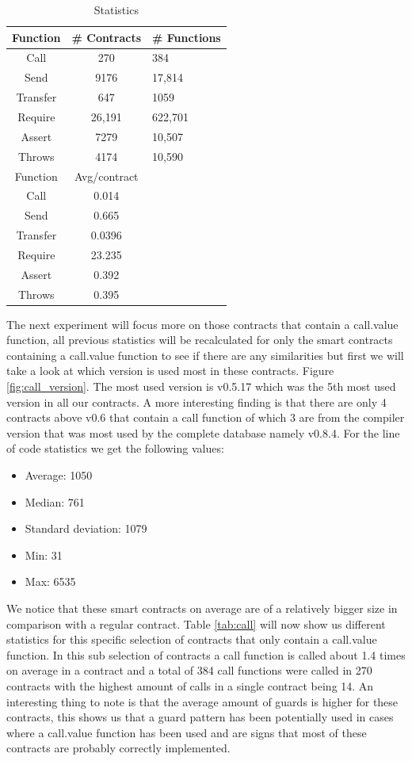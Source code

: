 \documentclass[10pt,conference]{IEEEtran}
\begin{document}
\begin{table}
  \caption{Statistics}
  \label{tab:stats}
  \begin{tabular}{ccl}
    \hline
    Function & \# Contracts & \# Functions\\
    \hline
    Call&270&384\\
    Send&9176&17,814\\
    Transfer&647&1059\\
    Require&26,191&622,701\\
    Assert&7279&10,507\\
    Throws&4174&10,590\\
    \hline
    Function & Avg/contract\\
    \hline
    Call&0.014\\
    Send&0.665\\
    Transfer&0.0396\\
    Require&23.235\\
    Assert&0.392\\
    Throws&0.395\\
  \hline
\end{tabular}
\end{table}
The next experiment will focus more on those contracts that contain a call.value function, all previous statistics will be recalculated for only the smart contracts containing a call.value function to see if there are any similarities but first we will take a look at which version is used most in these contracts.
Figure \ref{fig:call_version}. The most used version is v0.5.17 which was the 5th most used version in all our contracts. A more interesting finding is that there are only 4 contracts above v0.6 that contain a call function of which 3 are from the compiler version that was most used by the complete database namely v0.8.4. For the line of code statistics we get the following values:
\begin{itemize}
    \item Average: 1050
    \item Median: 761
    \item Standard deviation: 1079
    \item Min: 31
    \item Max: 6535
\end{itemize}
We notice that these smart contracts on average are of a relatively bigger size in comparison with a regular contract.
Table \ref{tab:call} will now show us different statistics for this specific selection of contracts that only contain a call.value function. In this sub selection of contracts a call function is called about 1.4 times on average in a contract and a total of 384 call functions were called in 270 contracts with the highest amount of calls in a single contract being 14. An interesting thing to note is that the average amount of guards is higher for these contracts, this shows us that a guard pattern has been potentially used in cases where a call.value function has been used and are signs that most of these contracts are probably correctly implemented. 
\end{document}
